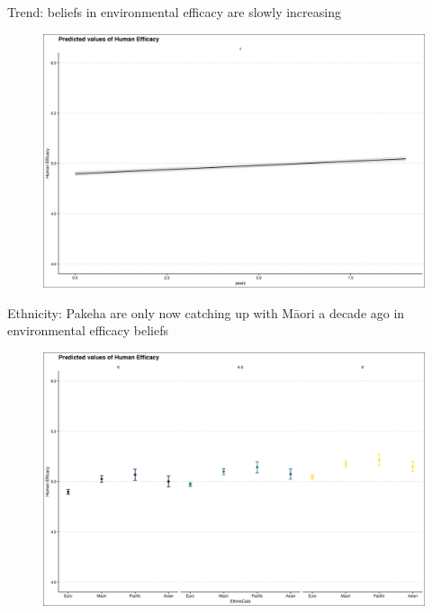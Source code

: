 \documentclass{beamer}
\begin{document}
\begin{frame}{Trend: beliefs in environmental efficacy are slowly increasing}
\begin{figure}
\includegraphics[width=.8\textwidth,height=\textheight,keepaspectratio]{Figures/EFFICACY_TIME.png}
\end{figure}
\end{frame}

\begin{frame}{Ethnicity: Pakeha are only now catching up with Māori a decade ago in environmental efficacy beliefs}
\begin{figure}
\includegraphics[width=.8\textwidth,height=\textheight,keepaspectratio]{Figures/EFFICACY_EthnicCats_T.png}
\end{figure}
\end{frame}
\end{document}
